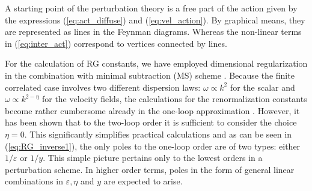 \documentclass[aps,pre,url,twocolumn,superscriptaddress]{revtex4-1}
\def\eps{\varepsilon}
\begin{document}
A starting point of the perturbation theory is a free part of the action
given by the expressions (\ref{eq:act_diffuse}) and (\ref{eq:vel_action}).
By graphical means, they are represented as lines in the Feynman diagrams. 
Whereas the non-linear terms  in (\ref{eq:inter_act}) correspond to vertices
connected by lines.

For the calculation of RG constants, we have employed dimensional regularization in the
combination with minimal subtraction (MS)  scheme \cite{Zinn}. 
Because the finite correlated case involves two different dispersion laws: 
$\omega\propto k^2$ for the scalar and
$\omega\propto k^{2-\eta}$
for the velocity fields, the calculations for the renormalization constants become
rather cumbersome already in the one-loop approximation \cite{Ant99,Ant00}.
However, it has been shown \cite{AdzAntHon02} that to the two-loop order it is sufficient to
consider the choice $\eta = 0$. This significantly simplifies practical calculations
and as can be seen in (\ref{eq:RG_inverse1}), the only poles to the one-loop order are of
 two types: either $1/\eps$ or $1/y$.
This simple picture pertains only to the lowest orders in a
perturbation scheme. In higher order terms, poles in the form
of general linear combinations in $\eps,\eta$ and $y$ are expected to arise.
\end{document}
